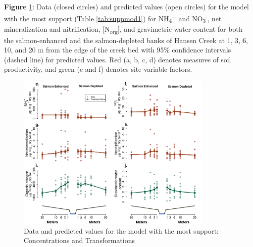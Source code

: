 \documentclass [11pt, proquest] {uwthesis}[2015/03/03]
\begin{document}
\textbf{Figure} \ref{fig:modConc}: Data (closed circles) and predicted
values (open circles) for the model with the most support (Table
\ref{tab:suppmod1}) for NH\textsubscript{4}\textsuperscript{+} and
NO\textsubscript{3}\textsuperscript{-}, net mineralization and
nitrification, {[}N\textsubscript{org}{]}, and gravimetric water content
for both the salmon-enhanced and the salmon-depleted banks of Hansen
Creek at 1, 3, 6, 10, and 20 m from the edge of the creek bed with 95\%
confidence intervals (dashed line) for predicted values. Red (a, b, c,
d) denotes measures of soil productivity, and green (e and f) denotes
site variable factors.\newline 
\begin{figure}[h]
  \includegraphics[width=0.85\textwidth]{figure/Ch1/Figure3_Feddernetal.pdf}
  \caption{Data and predicted values for the model with the most support: Concentrations and Transformations}
  \label{fig:modConc}
\end{figure}
\clearpage
\end{document}
